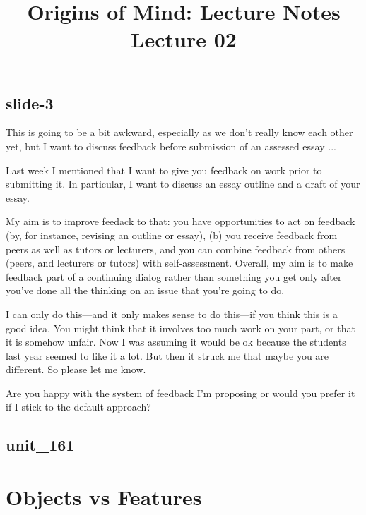 \documentclass[12pt,\papersize]{extarticle}
\begin{document}
\setlength\footnotesep{1em}







      
\title {Origins of Mind: Lecture Notes \\ Lecture 02}
 
 
 
\maketitle
 
\subsection{slide-3}
This is going to be a bit awkward, especially as we don't really know each other yet, 
but I want to discuss feedback before submission of an assessed essay ...
 
Last week I mentioned that I want to give you feedback on work prior to submitting it.
In particular, I want to discuss an essay outline and a draft of your essay.
 
My aim is to improve feedack to that: you  have opportunities to act on feedback (by, 
for instance, revising an outline or essay), (b) you receive feedback from peers as well as 
tutors or lecturers, and you can combine feedback from others (peers, and lecturers or 
tutors) with self-assessment.
Overall, my aim is to make feedback part of a continuing dialog rather than something you get
only after you've done all the thinking on an issue that you're going to do.
 
I can only do this---and it only makes sense to do this---if you think this is a good idea.
You might think that it involves too much work on your part, or that it is somehow unfair.
Now I was assuming it would be ok because the students last year seemed to like it a lot.
But then it struck me that maybe you are different.  So please let me know.
 
Are you happy with the system of feedback I'm proposing or would you prefer it if I stick to 
the default approach?
 
\subsection{unit\_161}
 
 
\section{Objects vs Features}
 
\end{document}
